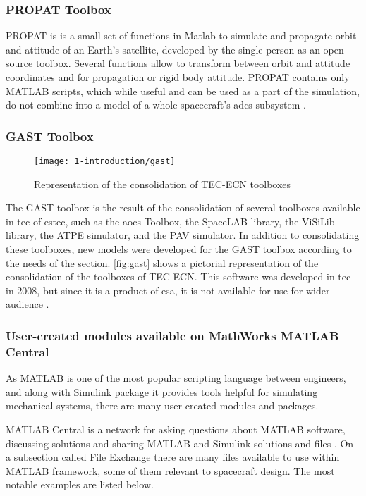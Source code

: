     \subsubsection{PROPAT Toolbox}
        PROPAT is is a small set of functions in Matlab to simulate and propagate orbit and attitude of an Earth's satellite, developed by the single person as an open-source toolbox. Several functions allow to transform between orbit and attitude coordinates and for propagation or rigid body attitude. PROPAT contains only MATLAB scripts, which while useful and can be used as a part of the simulation, do not combine into a model of a whole spacecraft's \ac{adcs} subsystem \cite{propat}.

    \subsubsection{GAST Toolbox}
        \begin{figure}[H]
            \centering
            \texttt{[image: 1-introduction/gast]}
            \caption{Representation of the consolidation of TEC-ECN toolboxes}
            \label{fig:gast}
        \end{figure}

        The GAST toolbox is the result of the consolidation of several toolboxes available in \ac{tec} of \ac{estec}, such as the \ac{aocs} Toolbox, the SpaceLAB library, the ViSiLib library, the ATPE simulator, and the PAV simulator. In addition to consolidating these toolboxes, new models were developed for the GAST toolbox according to the needs of the section. \autoref{fig:gast} shows a pictorial representation of the consolidation of the toolboxes of TEC-ECN. This software was developed in \ac{tec} in 2008, but since it is a product of \ac{esa}, it is not available for use for wider audience \cite{gast}.

    \subsubsection{User-created modules available on MathWorks MATLAB Central}
    As MATLAB is one of the most popular scripting language between engineers, and along with Simulink package it provides tools helpful for simulating mechanical systems, there are many user created modules and packages.
    
    MATLAB Central is a network for asking questions about MATLAB software, discussing solutions and sharing MATLAB and Simulink solutions and files \cite{matlabcentral}. On a subsection called File Exchange there are many files available to use within MATLAB framework, some of them relevant to spacecraft design. The most notable examples are listed below.

